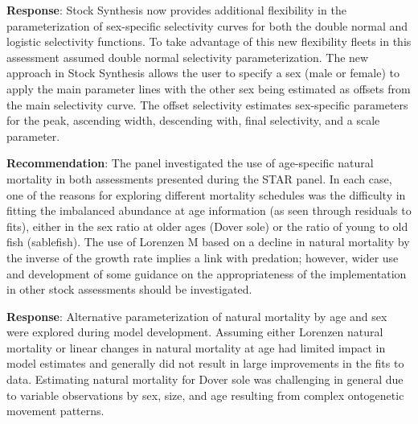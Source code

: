 \documentclass[11pt,
  english,
  a4paper,
]{article}
\begin{document}

\textbf{Response}: Stock Synthesis now provides additional flexibility in the parameterization of sex-specific selectivity curves for both the double normal and logistic selectivity functions. To take advantage of this new flexibility fleets in this assessment assumed double normal selectivity parameterization. The new approach in Stock Synthesis allows the user to specify a sex (male or female) to apply the main parameter lines with the other sex being estimated as offsets from the main selectivity curve. The offset selectivity estimates sex-specific parameters for the peak, ascending width, descending with, final selectivity, and a scale parameter.

\leavevmode\tagmcend\tagstructend\par


\textbf{Recommendation}: The panel investigated the use of age-specific natural mortality in both assessments presented during the STAR panel. In each case, one of the reasons for exploring different mortality schedules was the difficulty in fitting the imbalanced abundance at age information (as seen through residuals to fits), either in the sex ratio at older ages (Dover sole) or the ratio of young to old fish (sablefish). The use of Lorenzen M based on a decline in natural mortality by the inverse of the growth rate implies a link with predation; however, wider use and development of some guidance on the appropriateness of the implementation in other stock assessments should be investigated.

\leavevmode\tagmcend\tagstructend\par


\textbf{Response}: Alternative parameterization of natural mortality by age and sex were explored during model development. Assuming either Lorenzen natural mortality or linear changes in natural mortality at age had limited impact in model estimates and generally did not result in large improvements in the fits to data. Estimating natural mortality for Dover sole was challenging in general due to variable observations by sex, size, and age resulting from complex ontogenetic movement patterns.

\leavevmode\tagmcend\tagstructend\par

\end{document}
